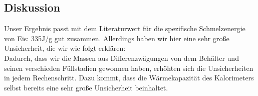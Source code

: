 \documentclass{article}
\begin{document}
\subsection{Diskussion}
Unser Ergebnis passt mit dem Literaturwert für die spezifische Schmelzenergie von Eis: 335J/g gut zusammen. Allerdings haben wir hier eine sehr große Unsicherheit, die wir wie folgt erklären:\\
Dadurch, dass wir die Massen aus Differenzwägungen von dem Behälter und seinen verschieden Füllstadien gewonnen haben, erhöhten sich die Unsicherheiten in jedem Rechenschritt. Dazu kommt, dass die Wärmekapazität des Kalorimeters selbst bereits eine sehr große Unsicherheit beinhaltet.
\end{document}
